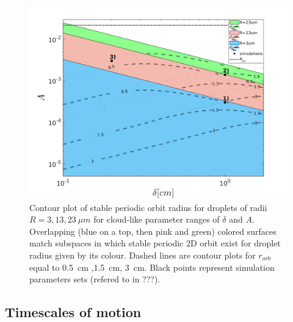 \documentclass[../main.tex]{subfiles}
\begin{document}
\begin{figure}
\centering
\noindent \includegraphics[width=30pc]{gfx/fig05.png}
\caption{Contour plot of stable periodic orbit radius for droplets of radii $R=3,13,23 \ \mu m$ for cloud-like parameter ranges of $\delta$ and $A$. Overlapping (blue on a top, then pink and green) colored surfaces match subspaces in which stable periodic 2D orbit exist for droplet radius given by its colour. Dashed lines are contour plots for $r_{orb}$ equal to 0.5~cm ,1.5~cm, 3~cm. Black points represent simulation parameters sets (refered to in ???).}
\label{fig:ch4_30}
\end{figure}

\subsection{Timescales of motion}
\end{document}
